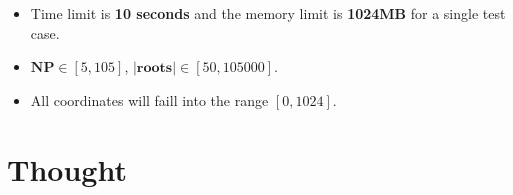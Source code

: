 \documentclass[UTF8]{ctexart}
\theoremstyle{definition}
\theoremstyle{remark}
\numberwithin{equation}{subsection}
\newcommand{\Emph}{\textbf}
\begin{document}
	\begin{itemize}
	
		\item Time limit is \Emph{10 seconds} and the memory limit is \Emph{1024MB} for a single test case.
		
		\item $\Emph{NP} \in [5, 105]$, $\Emph{|roots|} \in [50, 105000]$.
		
		\item All coordinates will faill into the range $[0, 1024]$.
		
	\end{itemize}
	
	
\section{Thought}	
\end{document}
